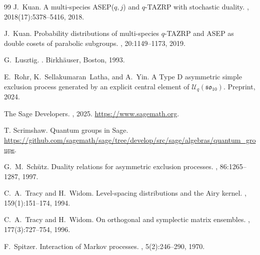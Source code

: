 \documentclass{ximera}
\begin{document}
\begin{thebibliography}{99}
J.~Kuan.
\newblock A multi-species ASEP($q,j$) and $q$-TAZRP with stochastic duality.
, 2018(17):5378--5416, 2018.

J.~Kuan.
\newblock Probability distributions of multi-species $q$-TAZRP and ASEP as double cosets of parabolic subgroups.
, 20:1149--1173, 2019.

G.~Lusztig.
.
\newblock Birkh\"{a}user, Boston, 1993.

E.~Rohr, K.~Sellakumaran~Latha, and A.~Yin.
\newblock A Type D asymmetric simple exclusion process generated by an explicit central element of $\mathcal{U}_q(\mathfrak{so}_{10})$.
\newblock Preprint, 2024.

The Sage Developers.
, 2025.
\newblock \url{https://www.sagemath.org}.

T. Scrimshaw.
\newblock Quantum groups in Sage. 
\newblock \url{https://github.com/sagemath/sage/tree/develop/src/sage/algebras/quantum_groups}.

G.~M.~Sch\"{u}tz.
\newblock Duality relations for asymmetric exclusion processes.
, 86:1265--1287, 1997.

C.~A.~Tracy and H.~Widom.
\newblock Level-spacing distributions and the Airy kernel.
, 159(1):151--174, 1994.

C.~A.~Tracy and H.~Widom.
\newblock On orthogonal and symplectic matrix ensembles.
, 177(3):727--754, 1996.

F.~Spitzer.
\newblock Interaction of Markov processes.
, 5(2):246--290, 1970.

\end{thebibliography}
\end{document}
